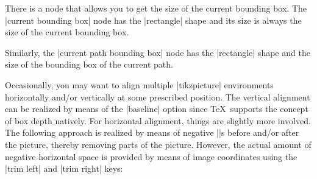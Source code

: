 There is a node that allows you to get the size of the current bounding box.
The |current bounding box| node has the |rectangle| shape and its size is
always the size of the current bounding box.

Similarly, the |current path bounding box| node has the |rectangle| shape and
the size of the bounding box of the current path.
%
\begin{codeexample}[pre={\begin{lateximage}},post={\end{lateximage}}]
\end{codeexample}

Occasionally, you may want to align multiple |tikzpicture| environments
horizontally and/or vertically at some prescribed position. The vertical
alignment can be realized by means of the |baseline| option since \TeX\
supports the concept of box depth natively. For horizontal alignment, things
are slightly more involved. The following approach is realized by means of
negative |\hspace|s before and/or after the picture, thereby removing parts of
the picture. However, the actual amount of negative horizontal space is
provided by means of image coordinates using the |trim left| and |trim right|
keys:


